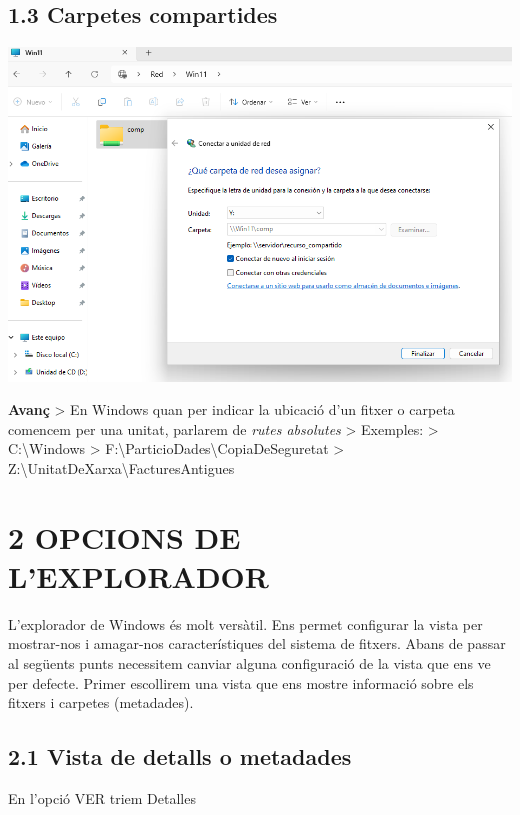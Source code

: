 \documentclass[
  a4paper,
]{article}
\begin{document}
\subsection{1.3 Carpetes compartides}\label{carpetes-compartides}

\includegraphics{png/conectarUnitat.png}

\textbf{Avanç} \textgreater{} En Windows quan per indicar la ubicació
d'un fitxer o carpeta comencem per una unitat, parlarem de \emph{rutes
absolutes} \textgreater{} Exemples: \textgreater{}
C:\textbackslash Windows \textgreater{}
F:\textbackslash ParticioDades\textbackslash CopiaDeSeguretat
\textgreater{}
Z:\textbackslash UnitatDeXarxa\textbackslash FacturesAntigues

\section{2 OPCIONS DE L'EXPLORADOR}\label{opcions-de-lexplorador}

L'explorador de Windows és molt versàtil. Ens permet configurar la vista
per mostrar-nos i amagar-nos característiques del sistema de fitxers.
Abans de passar al següents punts necessitem canviar alguna configuració
de la vista que ens ve per defecte. Primer escollirem una vista que ens
mostre informació sobre els fitxers i carpetes (metadades).

\subsection{2.1 Vista de detalls o
metadades}\label{vista-de-detalls-o-metadades}

En l'opció VER triem Detalles
\end{document}
